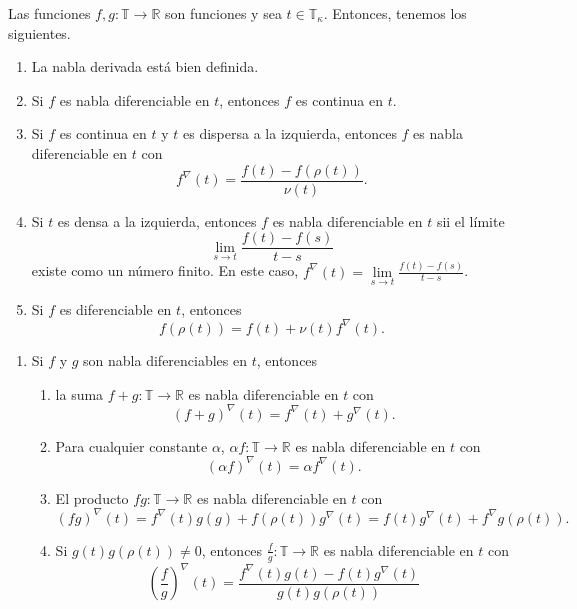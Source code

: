 \begin{frame}
	\begin{theorem}
		Las funciones $f,g\colon\mathds{T}\rightarrow\mathds{R}$ son funciones y sea $t\in\mathds{T}_{\kappa}$. Entonces, tenemos los siguientes.
		\begin{enumerate}
			\item La nabla derivada está bien definida.
			\item Si $f$ es nabla diferenciable en $t$, entonces $f$ es continua en $t$.
			\item Si $f$ es continua en $t$ y $t$ es dispersa a la izquierda, entonces $f$ es nabla diferenciable en $t$ con \[ f^{\nabla}\left(t\right)=\frac{f\left(t\right)-f\left(\rho\left(t\right)\right)}{\nu\left(t\right)}. \]
			\item Si $t$ es densa a la izquierda, entonces $f$ es nabla diferenciable en $t$ sii el límite \[ \lim\limits_{s\to t}\frac{f\left(t\right)-f\left(s\right)}{t-s} \] existe como un número finito. En este caso, $f^{\nabla}\left(t\right)=\lim\limits_{s\to t}\frac{f\left(t\right)-f\left(s\right)}{t-s}$.
			\item Si $f$ es diferenciable en $t$, entonces \[ f\left(\rho\left(t\right)\right)=f\left(t\right)+\nu\left(t\right)f^{\nabla}\left(t\right). \]
		\end{enumerate}
	\end{theorem}
\end{frame}

\begin{frame}%
	\begin{theorem}
	\begin{enumerate}
		\item Si $f$ y $g$ son nabla diferenciables en $t$, entonces
		\begin{enumerate}
			\item la suma $f+g\colon\mathds{T}\rightarrow\mathds{R}$ es nabla diferenciable en $t$ con \[ {\left(f+g\right)}^{\nabla}\left(t\right)=f^{\nabla}\left(t\right)+g^{\nabla}\left(t\right). \]
			\item Para cualquier constante $\alpha$, $\alpha f\colon\mathds{T}\rightarrow\mathds{R}$ es nabla diferenciable en $t$ con \[ {\left(\alpha f\right)}^{\nabla}\left(t\right)=\alpha f^{\nabla}\left(t\right). \]
			\item El producto $fg\colon\mathds{T}\rightarrow\mathds{R}$ es nabla diferenciable en $t$ con \[ {\left(fg\right)}^{\nabla}\left(t\right)=f^{\nabla}\left(t\right)g\left(g\right)+f\left(\rho\left(t\right)\right)g^{\nabla}\left(t\right)=f\left(t\right)g^{\nabla}\left(t\right)+f^{\nabla}g\left(\rho\left(t\right)\right). \]
			\item Si $g\left(t\right)g\left(\rho\left(t\right)\right)\neq0$, entonces $\frac{f}{g}\colon\mathds{T}\rightarrow\mathds{R}$ es nabla diferenciable en $t$ con \[ {\left(\frac{f}{g}\right)}^{\nabla}\left(t\right)=\frac{f^{\nabla}\left(t\right)g\left(t\right)-f\left(t\right)g^{\nabla}\left(t\right)}{g\left(t\right)g\left(\rho\left(t\right)\right)} \]
		\end{enumerate}
	\end{enumerate}
	\end{theorem}
\end{frame}

